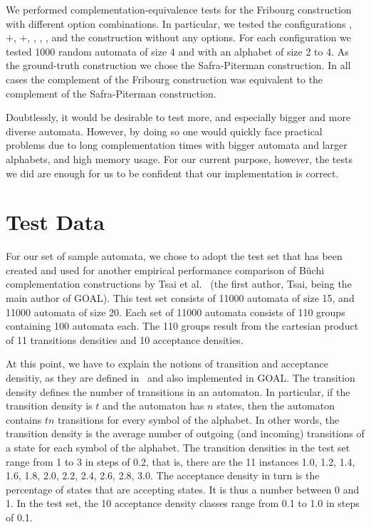 We performed complementation-equivalence tests for the Fribourg construction with different option combinations. In particular, we tested the configurations , +, +, , , , and the construction without any options. For each configuration we tested 1000 random automata of size 4 and with an alphabet of size 2 to 4. As the ground-truth construction we chose the Safra-Piterman construction. In all cases the complement of the Fribourg construction was equivalent to the complement of the Safra-Piterman construction.

Doubtlessly, it would be desirable to test more, and especially bigger and more diverse automata. However, by doing so one would quickly face practical problems due to long complementation times with bigger automata and larger alphabets, and high memory usage. For our current purpose, however, the tests we did are enough for us to be confident that our implementation is correct.

\section{Test Data}
For our set of sample automata, we chose to adopt the test set that has been created and used for another empirical performance comparison of Büchi complementation constructions by Tsai et al.~\cite{2010_tsai} (the first author, Tsai, being the main author of GOAL). This test set consists of 11000 automata of size 15, and 11000 automata of size 20. Each set of 11000 automata consists of 110 groups containing 100 automata each. The 110 groups result from the cartesian product of 11 transitions densities and 10 acceptance densities.

At this point, we have to explain the notions of transition and acceptance densitiy, as they are defined in~\cite{2010_tsai} and also implemented in GOAL. The transition density defines the number of transitions in an automaton. In particular, if the transition density is $t$ and the automaton has $n$ states, then the automaton contains $tn$ transitions for every symbol of the alphabet. In other words, the transition density is the average number of outgoing (and incoming) transitions of a state for each symbol of the alphabet. The transition densities in the test set range from 1 to 3 in steps of 0.2, that is, there are the 11 instances 1.0, 1.2, 1.4, 1.6, 1.8, 2.0, 2.2, 2.4, 2.6, 2.8, 3.0. The acceptance density in turn is the percentage of states that are accepting states. It is thus a number between 0 and 1. In the test set, the 10 acceptance density classes range from 0.1 to 1.0 in steps of 0.1.

